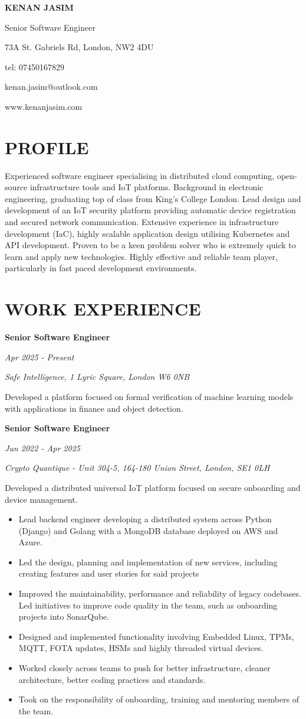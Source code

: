 \documentclass[11pt,a4paper]{article}
\newcommand{\header}[6]{
    \noindent
    \begin{minipage}[t]{0.6\textwidth}
        {\Huge\bfseries #1}
        
        \vspace{5pt}
        {\Large #2}
    \end{minipage}%
    \hfill
    \begin{minipage}[t]{0.35\textwidth}
        \raggedleft
        #3
        
        tel: #4
        
        #5
        
        #6
    \end{minipage}
    
    \vspace{20pt}
}
\newcommand{\cventry}[5]{
    \noindent
    \begin{minipage}[t]{0.3\textwidth}
        \raggedright
        \textbf{#1}
        
        \textit{#2}
    \end{minipage}%
    \hfill
    \begin{minipage}[t]{0.7\textwidth}
        \raggedright
        \textit{#3}
        
        #4
        
        #5
    \end{minipage}
    
    \vspace{8pt}
}
\begin{document}
\header{KENAN JASIM}{Senior Software Engineer}{73A St. Gabriels Rd, London, NW2 4DU}{07450167829}{kenan.jasim@outlook.com}{www.kenanjasim.com}

\section{PROFILE}
Experienced software engineer specialising in distributed cloud computing, open-source infrastructure tools and IoT platforms. Background in electronic engineering, graduating top of class from King's College London. Lead design and development of an IoT security platform providing automatic device registration and secured network communication. Extensive experience in infrastructure development (IaC), highly scalable application design utilising Kubernetes and API development. Proven to be a keen problem solver who is extremely quick to learn and apply new technologies. Highly effective and reliable team player, particularly in fast paced development environments.

\section{WORK EXPERIENCE}

\cventry{Senior Software Engineer}{Apr 2025 - Present}{Safe Intelligence, 1 Lyric Square, London W6 0NB}{}{
Developed a platform focused on formal verification of machine learning models with applications in finance and object detection.
}

\cventry{Senior Software Engineer}{Jun 2022 - Apr 2025}{Crypto Quantique - Unit 304-5, 164-180 Union Street, London, SE1 0LH}{}{
Developed a distributed universal IoT platform focused on secure onboarding and device management.
\begin{itemize}[leftmargin=15pt, itemsep=2pt]
    \item Lead backend engineer developing a distributed system across Python (Django) and Golang with a MongoDB database deployed on AWS and Azure.
    \item Led the design, planning and implementation of new services, including creating features and user stories for said projects
    \item Improved the maintainability, performance and reliability of legacy codebases. Led initiatives to improve code quality in the team, such as onboarding projects into SonarQube.
    \item Designed and implemented functionality involving Embedded Linux, TPMs, MQTT, FOTA updates, HSMs and highly threaded virtual devices.
    \item Worked closely across teams to push for better infrastructure, cleaner architecture, better coding practices and standards.
    \item Took on the responsibility of onboarding, training and mentoring members of the team.
\end{itemize}
}
\end{document}
